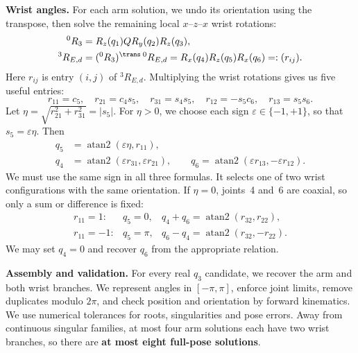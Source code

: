 \textbf{Wrist angles.}
For each arm solution, we undo its orientation using the transpose, then solve
the remaining local $x$--$z$--$x$ wrist rotations:
\begin{equation}
 \begin{aligned}
 {}^0R_3&=R_z(q_1)Q R_y(q_2)R_z(q_3),\\
 {}^3R_{E,d}&=({}^0R_3)^\trans\,{}^0R_{E,d}
             =R_x(q_4)R_z(q_5)R_x(q_6)=:(r_{ij}).
 \end{aligned}
 \label{eq:ik-wrist-rotation}
\end{equation}
Here $r_{ij}$ is entry $(i,j)$ of ${}^3R_{E,d}$. Multiplying the wrist
rotations gives us five useful entries:
\begin{equation}
 r_{11}=c_5,\quad r_{21}=c_4s_5,\quad r_{31}=s_4s_5,\quad
 r_{12}=-s_5c_6,\quad r_{13}=s_5s_6.
 \label{eq:ik-wrist-entries}
\end{equation}
Let $\eta=\sqrt{r_{21}^2+r_{31}^2}=|s_5|$. For $\eta>0$, we choose each sign
$\varepsilon\in\{-1,+1\}$, so that $s_5=\varepsilon\eta$. Then
\begin{equation}
 \boxed{\begin{aligned}
 q_5&=\operatorname{atan2}(\varepsilon\eta,r_{11}),\\
 q_4&=\operatorname{atan2}(\varepsilon r_{31},\varepsilon r_{21}),\qquad
 q_6=\operatorname{atan2}(\varepsilon r_{13},-\varepsilon r_{12}).
 \end{aligned}}
 \label{eq:ik-wrist-solutions}
\end{equation}
We must use the same sign in all three formulas. It selects one of two
wrist configurations with the same orientation. If $\eta=0$, joints~4 and~6
are coaxial, so only a sum or difference is fixed:
\begin{equation}
 \begin{array}{lll}
 r_{11}=1: &q_5=0,&q_4+q_6=\operatorname{atan2}(r_{32},r_{22}),\\[2pt]
 r_{11}=-1:&q_5=\pi,&q_6-q_4=\operatorname{atan2}(r_{32},-r_{22}).
 \end{array}
 \label{eq:ik-wrist-singularity}
\end{equation}
We may set $q_4=0$ and recover $q_6$ from the appropriate relation.

\textbf{Assembly and validation.}
For every real $q_3$ candidate, we recover the arm and both wrist branches.
We represent angles in $[-\pi,\pi]$, enforce joint limits, remove duplicates
modulo $2\pi$, and check position and orientation by forward kinematics.
We use numerical tolerances for roots, singularities and pose errors.
Away from continuous singular families, at most four arm solutions each
have two wrist branches, so there are \textbf{at most eight full-pose solutions}.
